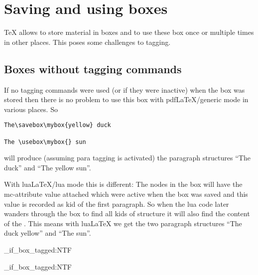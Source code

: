\documentclass{article}
\newcommand\teststructure[1]{\tagstructbegin{tag=Span}\tagmcbegin{}#1\tagmcend\tagstructend}
\begin{document}
\section{Saving and using boxes}

\TeX{} allows to store material in boxes and to use these box once or multiple times in other places.
This poses some challenges to tagging.

\subsection{Boxes without tagging commands}

If no tagging commands were used (or if they were inactive) when the box was stored then
there is no problem to use this box with pdf\LaTeX{}/generic mode in various places. So

\begin{verbatim}
The\savebox\mybox{yellow} duck

The \usebox\mybox{} sun
\end{verbatim}

will produce (assuming para tagging is activated) the paragraph structures \enquote{The duck} and \enquote{The yellow sun}.

With lua\LaTeX{}/lua mode this is different: The nodes in the box will have the mc-attribute value attached which were
active when the box was saved and this value is recorded as kid of the first paragraph. So when the lua code later wanders through the box to find all kids of structure it will also find the content of the . This means with lua\LaTeX{} we get the two paragraph structures \enquote{The duck yellow} and \enquote{The sun}. 








\ExplSyntaxOn
\tag_if_box_tagged:NTF 


\savebox\mybox{\teststructure{blub}}

\tag_if_box_tagged:NTF 

\ExplSyntaxOff
\end{document}

